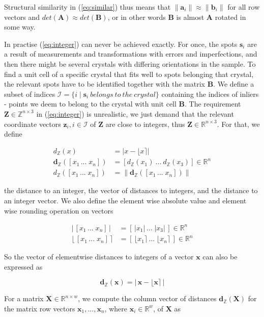 \documentclass[a4paper,10pt]{article}
\newcommand{\vect}[1]{\mathbf{#1}}
\newcommand{\mat}[1]{\mathbf{#1}}
\newcommand{\round}[1]{\lfloor #1 \rceil}
\newcommand{\distZ}[1]{d_\mathbb{Z}(#1)}
\newcommand{\distvecZ}[1]{\vect{d}_\mathbb{Z}(#1)}
\begin{document}
Structural similarity in (\ref{eq:similar}) thus means that $\|\vect{a}_i\| \approx \|\vect{b}_i\|$ for all row vectors and $det(\mat{A}) \approx det(\mat{B})$, or in other words $\mat{B}$ is almost $\mat{A}$ rotated in some way.

In practise (\ref{eq:integer}) can never be achieved exactly. For once, the spots $\vect{s}_i$ are a result of measurements and transformations with errors and imperfections, and then there might be several crystals with differing orientations in the sample. To find a unit cell of a specific crystal that fits well to spots belonging that crystal, the relevant spots have to be identified together with the matrix $\mat{B}$. We define a subset of indices $\mathcal{I} = \{i \mid \vect{s}_i\ belongs\ to\ the\ crystal \}$ containing the indices of inliers - points we deem to belong to the crystal with unit cell $\mat{B}$. The requirement $\mat{Z} \in \mathbb{Z}^{n \times 3}$ in (\ref{eq:integer}) is unrealistic, we just demand that the relevant coordinate vectors $\vect{z}_i, i \in \mathcal{I}$ of $\mat{Z}$ are close to integers, thus $\mat{Z} \in \mathbb{R}^{n \times 3}$. For that, we define

\[
 \begin{split}
  \distZ{x} &= |x - \round{x}| \\
  \distvecZ{[x_1\, ...\; x_n]} &= [\distZ{x_1}\ ...\ \distZ{x_3}] \in \mathbb{R}^n\\
  \distZ{[x_1\, ...\; x_n]} &= \|\distvecZ{[x_1\, ...\; x_n]}\|
 \end{split}
\]

the distance to an integer, the vector of distances to integers, and the distance to an integer vector. We also define the element wise absolute value and element wise rounding operation on vectors

\[
 \begin{split}
  |\,[x_1\, ...\; x_n]\,| &= [\,|x_1|\, ...\; |x_3|\,] \in \mathbb{R}^n\\
  \round{\,[x_1\, ...\; x_n]\,} &= [\,\round{x_1}\, ...\; \round{x_n}\,] \in \mathbb{R}^n
 \end{split}
\]

So the vector of elementwise distances to integers of a vector $\vect{x}$ can also be expressed as

\[
  \distvecZ{\vect{x}} = |\, \vect{x} - \round{\vect{x}}\,|
\]

For a matrix $\mat{X}\in \mathbb{R}^{n\times w}$, we compute the column vector of distances $\vect{d}_{\mathbb{Z}}(\mat{X})$ for the matrix row vectors $\vect{x}_1,\hdots ,\vect{x}_n$, where $\vect{x}_i\in \mathbb{R}^w$, of $\mat{X}$ as
\end{document}
